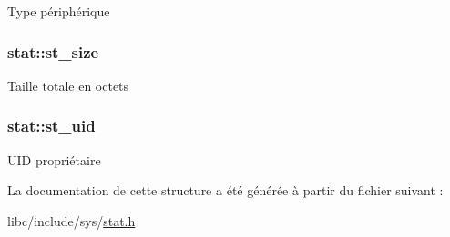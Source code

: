 \-Type périphérique \hypertarget{structstat_a040e19c8b9766f841fde8786ce9297bf}{
\subsubsection[{st\-\_\-size}]{ {\bf stat\-::st\-\_\-size}}}\label{structstat_a040e19c8b9766f841fde8786ce9297bf}
\-Taille totale en octets \hypertarget{structstat_a4a8708a3d18be60ee7b2f06c4cab0c70}{
\subsubsection[{st\-\_\-uid}]{ {\bf stat\-::st\-\_\-uid}}}\label{structstat_a4a8708a3d18be60ee7b2f06c4cab0c70}
\-U\-I\-D propriétaire 

\-La documentation de cette structure a été générée à partir du fichier suivant \-:\begin{DoxyCompactItemize}
\item 
libc/include/sys/\hyperlink{stat_8h}{stat.\-h}\end{DoxyCompactItemize}
